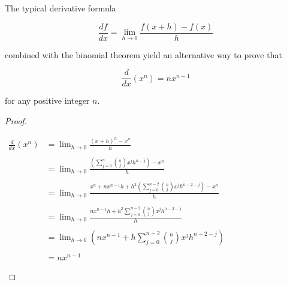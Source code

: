 \documentclass[12pt]{article}
\begin{document}
The typical derivative formula

$$\frac{df}{dx}=\lim_{h \to 0}\frac{f(x+h)-f(x)}{h}$$

combined with the binomial theorem yield an alternative way to prove that

$$ \frac{d}{dx}(x^n)=nx^{n-1}$$

for any positive integer $n$.

\begin{proof}
\begin{center}
$\begin{array}{ll}
\displaystyle \frac{d}{dx}(x^n) & \displaystyle =\lim_{h \to 0}\frac{(x+h)^n-x^n}{h} \\
& \\
& \displaystyle =\lim_{h \to 0}\frac{\displaystyle \left( \sum_{j=0}^n {n \choose j} x^j h^{n-j} \right) - x^n}{h}\\
& \\
& \displaystyle =\lim_{h \to 0}\frac{\displaystyle x^n+nx^{n-1}h+h^2 \left( \sum_{j=0}^{n-2} {n \choose j} x^j h^{n-2-j} \right) - x^n}{h} \\
& \\
& \displaystyle =\lim_{h \to 0}\frac{\displaystyle nx^{n-1}h+h^2 \sum_{j=0}^{n-2} {n \choose j} x^j h^{n-2-j}}{h} \\
& \\
& \displaystyle =\lim_{h \to 0} \left( nx^{n-1}+h \sum_{j=0}^{n-2} {n \choose j} x^j h^{n-2-j} \right) \\
& \\
& \displaystyle = nx^{n-1} \end{array}$
\end{center}
\end{proof}
\end{document}
